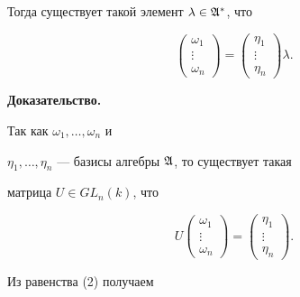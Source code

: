 \begin{lem}
\begin{equation}
\end{equation} 


Тогда существует такой элемент $\lambda\in\frak A^*$, что 


$$ 


\begin{pmatrix} 


\omega_1 \\ \vdots \\ \omega_n 


\end{pmatrix} 


= 


\begin{pmatrix} 


\eta_1 \\ \vdots \\ \eta_n 


\end{pmatrix} 


\lambda. 


$$ 


\end{lem} 





{\bf Доказательство.}


Так как $\omega_1,\dotsc,\omega_n$ и 


$\eta_1,\dotsc,\eta_n$ --- базисы алгебры $\frak A$, то существует такая 


матрица $U\in GL_n(k)$, что 


$$ 


U 


\begin{pmatrix} 


\omega_1 \\ \vdots \\ \omega_n 


\end{pmatrix} 


= 


\begin{pmatrix} 


\eta_1 \\ \vdots \\ \eta_n 


\end{pmatrix} 


. 


$$ 


Из равенства (2) получаем 


$$ 


